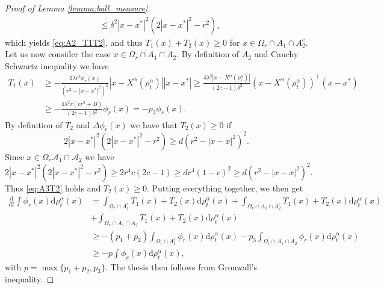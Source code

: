 \documentclass[reqno]{amsart}
\numberwithin{algorithm}{section}
\newcommand{\diff}{\mathrm{d}}
\newcommand{\Xalpha}{{X^\alpha}}
\begin{document}
{\begin{proof}[Proof of Lemma \ref{lemma:ball_measure}]
\begin{equation*}
\begin{aligned}
    &\leq \delta^2 |x-x^*|^2\left(2 |x-x^*|^2-r^2\right),
\end{aligned}\end{equation*}
which yields \eqref{eq:A2_T1T2}, and thus $T_1(x)+T_2(x)\geq 0$ for $x\in \Omega_r\cap A_1\cap A_2^c$.
Let us now consider the case $x\in \Omega_r\cap A_1\cap A_2$. By definition of $A_2$ and Cauchy Schwartz inequality we have 
\begin{equation}\begin{aligned}
    T_1(x)&\geq-\frac{2\lambda r^2\phi_r(x)}{(r^2- |x-x^*|^2)^2}|x-\Xalpha(\rho^\alpha_t)| |x-x^*|\geq \frac{4\lambda^2|x-\Xalpha(\rho^\alpha_t)|}{(2c-1)\delta^2}(x-\Xalpha(\rho^\alpha_t))^\top(x-x^*)\\
    & \geq -\frac{4\lambda^2r(cr^2+B)}{(2c-1)\delta^2}\phi_r(x) = -p_3\phi_r(x).
\end{aligned}\end{equation}
By definition of $T_2$ and $\Delta\phi_r(x)$ we have that $T_2(x)\geq 0 $ if 
\begin{equation}\label{eq:A3T2}
    2 |x-x^*|^2(2 |x-x^*|^2-r^2)\geq d(r^2-|x-x|^2)^2.
\end{equation}
Since $x\in\Omega_r\mathcal{A}_1\cap \mathcal{A}_2$ we have 
\begin{equation*}
  2 |x-x^*|^2(2 |x-x^*|^2-r^2)\geq 2r^4c(2c-1)\geq dr^4(1-c)^2\geq d(r^2-|x-x|^2)^2.
\end{equation*}
Thus \eqref{eq:A3T2} holds and $T_2(x)\geq 0$.
Putting everything together, we then get 
\begin{equation}\begin{aligned}
    \frac{\diff}{\diff t}\int\phi_r(x)\diff\rho^\alpha_t(x) &=
    \int_{\Omega_r\cap A_1^c} T_1(x)+T_2(x)\diff\rho^\alpha_t(x) +
    \int_{\Omega_r\cap A_1\cap A_2^c} T_1(x)+T_2(x)\diff\rho^\alpha_t(x) \\& +
    \int_{\Omega_r\cap A_1\cap A_2} T_1(x)+T_2(x)\diff\rho^\alpha_t(x)\\
    &\geq -(p_1+p_2)\int_{\Omega_r\cap A_1^c} \phi_r(x)\diff\rho^\alpha_t(x) 
    -p_3\int_{\Omega_r\cap A_1\cap A_2} \phi_r(x)\diff\rho^\alpha_t(x)\\
    &\geq -p\int\phi_r(x)\diff\rho^\alpha_t(x),
\end{aligned}\end{equation}
 with $p=\max\{p_1+p_2,p_3\}$. The thesis then follows from Gronwall's inequality.
\end{proof}

}
\end{document}
